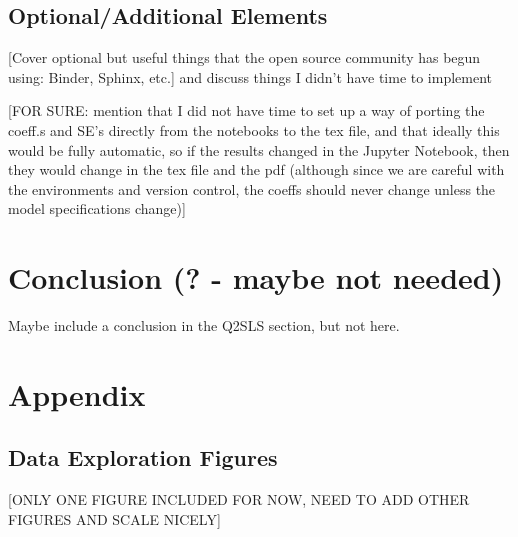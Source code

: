 \documentclass[12pt]{article}
\begin{document}
\subsection{Optional/Additional Elements}
\textcolor{BrickRed}{[Cover optional but useful things that the open source community has begun using: Binder, Sphinx, etc.] and discuss things I didn't have time to implement}

\textcolor{BrickRed}{[FOR SURE: mention that I did not have time to set up a way of porting the coeff.s and SE's directly from the notebooks to the tex file, and that ideally this would be fully automatic, so if the results changed in the Jupyter Notebook, then they would change in the tex file and the pdf (although since we are careful with the environments and version control, the coeffs should never change unless the model specifications change)]}


\newpage
\section{Conclusion (? - maybe not needed)}
Maybe include a conclusion in the Q2SLS section, but not here.

\newpage
\section{Appendix}

\subsection{Data Exploration Figures} \label{appendix_figs}
\textcolor{BrickRed}{[ONLY ONE FIGURE INCLUDED FOR NOW, NEED TO ADD OTHER FIGURES AND SCALE NICELY]}
\end{document}
